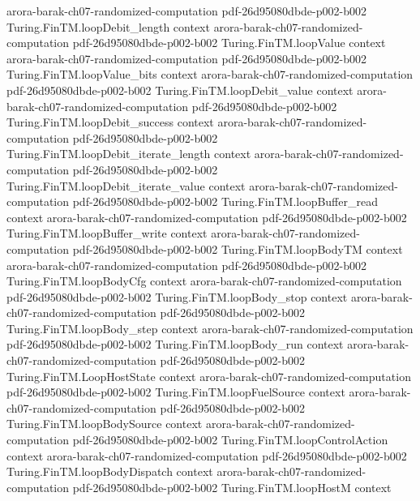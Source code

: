 \begin{theorem}
  {arora-barak-ch07-randomized-computation}
  {pdf-26d95080dbde-p002-b002}
\proofstep
  {Turing.FinTM.loopDebit_length}
  {context}
  {arora-barak-ch07-randomized-computation}
  {pdf-26d95080dbde-p002-b002}
\proofstep
  {Turing.FinTM.loopValue}
  {context}
  {arora-barak-ch07-randomized-computation}
  {pdf-26d95080dbde-p002-b002}
\proofstep
  {Turing.FinTM.loopValue_bits}
  {context}
  {arora-barak-ch07-randomized-computation}
  {pdf-26d95080dbde-p002-b002}
\proofstep
  {Turing.FinTM.loopDebit_value}
  {context}
  {arora-barak-ch07-randomized-computation}
  {pdf-26d95080dbde-p002-b002}
\proofstep
  {Turing.FinTM.loopDebit_success}
  {context}
  {arora-barak-ch07-randomized-computation}
  {pdf-26d95080dbde-p002-b002}
\proofstep
  {Turing.FinTM.loopDebit_iterate_length}
  {context}
  {arora-barak-ch07-randomized-computation}
  {pdf-26d95080dbde-p002-b002}
\proofstep
  {Turing.FinTM.loopDebit_iterate_value}
  {context}
  {arora-barak-ch07-randomized-computation}
  {pdf-26d95080dbde-p002-b002}
\proofstep
  {Turing.FinTM.loopBuffer_read}
  {context}
  {arora-barak-ch07-randomized-computation}
  {pdf-26d95080dbde-p002-b002}
\proofstep
  {Turing.FinTM.loopBuffer_write}
  {context}
  {arora-barak-ch07-randomized-computation}
  {pdf-26d95080dbde-p002-b002}
\proofstep
  {Turing.FinTM.loopBodyTM}
  {context}
  {arora-barak-ch07-randomized-computation}
  {pdf-26d95080dbde-p002-b002}
\proofstep
  {Turing.FinTM.loopBodyCfg}
  {context}
  {arora-barak-ch07-randomized-computation}
  {pdf-26d95080dbde-p002-b002}
\proofstep
  {Turing.FinTM.loopBody_stop}
  {context}
  {arora-barak-ch07-randomized-computation}
  {pdf-26d95080dbde-p002-b002}
\proofstep
  {Turing.FinTM.loopBody_step}
  {context}
  {arora-barak-ch07-randomized-computation}
  {pdf-26d95080dbde-p002-b002}
\proofstep
  {Turing.FinTM.loopBody_run}
  {context}
  {arora-barak-ch07-randomized-computation}
  {pdf-26d95080dbde-p002-b002}
\proofstep
  {Turing.FinTM.LoopHostState}
  {context}
  {arora-barak-ch07-randomized-computation}
  {pdf-26d95080dbde-p002-b002}
\proofstep
  {Turing.FinTM.loopFuelSource}
  {context}
  {arora-barak-ch07-randomized-computation}
  {pdf-26d95080dbde-p002-b002}
\proofstep
  {Turing.FinTM.loopBodySource}
  {context}
  {arora-barak-ch07-randomized-computation}
  {pdf-26d95080dbde-p002-b002}
\proofstep
  {Turing.FinTM.loopControlAction}
  {context}
  {arora-barak-ch07-randomized-computation}
  {pdf-26d95080dbde-p002-b002}
\proofstep
  {Turing.FinTM.loopBodyDispatch}
  {context}
  {arora-barak-ch07-randomized-computation}
  {pdf-26d95080dbde-p002-b002}
\proofstep
  {Turing.FinTM.loopHostM}
  {context}

\end{theorem}

